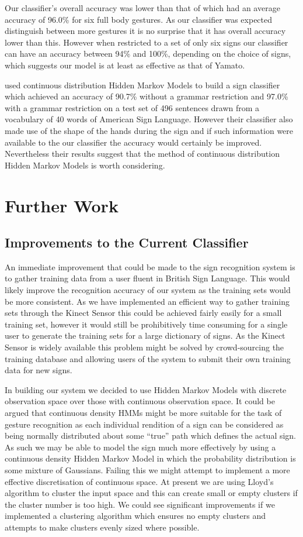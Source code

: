 Our classifier's overall accuracy was lower than that of \citet{yamato1992recognizing} which had an average accuracy of 96.0\% for six full body gestures. As our classifier was expected distinguish between more gestures it is no surprise that it has overall accuracy lower than this. However when restricted to a set of only six signs our classifier can have an accuracy between 94\% and 100\%, depending on the choice of signs, which suggests our model is at least as effective as that of Yamato.

\citet{starner1995real} used continuous distribution Hidden Markov Models to build a sign classifier which achieved an accuracy of 90.7\% without a grammar restriction and 97.0\% with a grammar restriction on a test set of 496 sentences drawn from a vocabulary of 40 words of American Sign Language. However their classifier also made use of the shape of the hands during the sign and if such information were available to the our classifier the accuracy would certainly be improved. Nevertheless their results suggest that the method of continuous distribution Hidden Markov Models is worth considering.

\section{Further Work}
\subsection{Improvements to the Current Classifier}
An immediate improvement that could be made to the sign recognition system is to gather training data from a user fluent in British Sign Language. This would likely improve the recognition accuracy of our system as the training sets would be more consistent. As we have implemented an efficient way to gather training sets through the Kinect Sensor this could be achieved fairly easily for a small training set, however it would still be prohibitively time consuming for a single user to generate the training sets for a large dictionary of signs. As the Kinect Sensor is widely available this problem might be solved by crowd-sourcing the training database and allowing users of the system to submit their own training data for new signs.

In building our system we decided to use Hidden Markov Models with discrete observation space over those with continuous observation space. It could be argued that continuous density HMMs might be more suitable for the task of gesture recognition as each individual rendition of a sign can be considered as being normally distributed about some ``true'' path which defines the actual sign. As such we may be able to model the sign much more effectively by using a continuous density Hidden Markov Model in which the probability distribution is some mixture of Gaussians. Failing this we might attempt to implement a more effective discretisation of continuous space. At present we are using Lloyd's algorithm to cluster the input space and this can create small or empty clusters if the cluster number is too high. We could see significant improvements if we implemented a clustering algorithm which ensures no empty clusters and attempts to make clusters evenly sized where possible.

